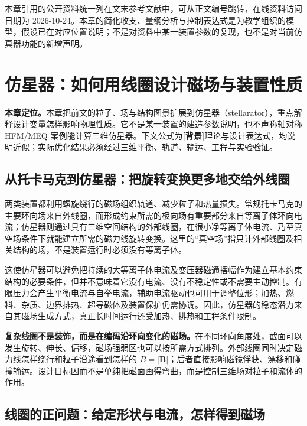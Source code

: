 \documentclass[12pt,fontset=none]{ctexart}
\numberwithin{equation}{section}
\numberwithin{table}{section}
\numberwithin{figure}{section}
\newcommand{\evbg}{\textbf{[背景]}}
\begin{document}
本章引用的公开资料统一列在文末参考文献中，可从正文编号跳转，在线资料访问日期为 2026-10-24。本章的简化收支、量纲分析与控制表达式是为教学组织的模型，假设已在对应位置说明；不是对资料中某一装置参数的复现，也不是对当前仿真器功能的新增声明。

\clearpage

\clearpage
\section{仿星器：如何用线圈设计磁场与装置性质}\label{sec:stellarator}

\textbf{本章定位。}本章把前文的粒子、场与结构图景扩展到仿星器（stellarator），重点解释设计变量怎样影响物理性质。它不是某一装置的建造参数说明，也不声称轴对称 HFM/MEQ 案例能计算三维仿星器。下文公式为\evbg{}理论与设计表达式，均说明近似；实际优化结果必须经过三维平衡、轨道、输运、工程与实验验证。

\subsection{从托卡马克到仿星器：把旋转变换更多地交给外线圈}\label{sec:stellarator-concept}

两类装置都利用螺旋绕行的磁场组织轨道、减少粒子和热量损失。常规托卡马克的主要环向场来自外线圈，而形成约束所需的极向场有重要部分来自等离子体环向电流；仿星器则通过具有三维空间结构的外部线圈，在很小净等离子体电流、乃至真空场条件下就能建立所需的磁力线旋转变换。这里的``真空场''指只计外部线圈及相关结构的场，不是装置运行时必须没有等离子体\cite{Sreview}。

这使仿星器可以避免把持续的大等离子体电流及变压器磁通摆幅作为建立基本约束结构的必要条件，但并不意味着它没有电流、没有不稳定性或不需要主动控制。有限压力会产生平衡电流与自举电流，辅助电流驱动也可用于调整位形；加热、燃料、杂质、边界排热、超导磁体及装置保护仍需协调。因此，仿星器的稳态潜力来自其磁场生成方式，真正长时间运行还受加热、排热和工程条件限制。

\textbf{复杂线圈不是装饰，而是在编码沿环向变化的磁场。}在不同环向角度处，截面可以发生旋转、伸长、偏移，磁场强弱区也可以按所需方式排列。外部线圈同时决定磁力线怎样绕行和粒子沿途看到怎样的 $B=|\bm B|$；后者直接影响磁镜俘获、漂移和碰撞输运。设计目标因而不是单纯把磁面画得弯曲，而是控制三维场对粒子和流体的作用。

\subsection{线圈的正问题：给定形状与电流，怎样得到磁场}\label{sec:stellarator-forward}
\end{document}
